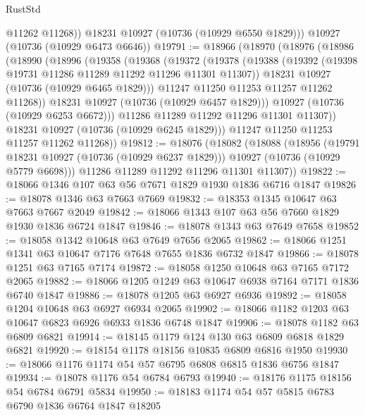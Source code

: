 \begin{lexlean}{RustStd}
\begin{coremodule}
          @11262
          @11268))
      @18231
      @10927
      (@10736 (@10929 @6550 @1829)))
    @10927
    (@10736 (@10929 @6473 @6646))
@19791 := @18966
    (@18970
      (@18976
        (@18986
          (@18990
            (@18996
              (@19358
                (@19368
                  (@19372
                    (@19378
                      (@19388
                        (@19392 (@19398 @19731 @11286 @11289 @11292 @11296 @11301 @11307))
                        @18231
                        @10927
                        (@10736 (@10929 @6465 @1829)))
                      @11247
                      @11250
                      @11253
                      @11257
                      @11262
                      @11268))
                  @18231
                  @10927
                  (@10736 (@10929 @6457 @1829)))
                @10927
                (@10736 (@10929 @6253 @6672)))
              @11286
              @11289
              @11292
              @11296
              @11301
              @11307))
          @18231
          @10927
          (@10736 (@10929 @6245 @1829)))
        @11247
        @11250
        @11253
        @11257
        @11262
        @11268))
@19812 := @18076
    (@18082
      (@18088
        (@18956
          (@19791 @18231 @10927 (@10736 (@10929 @6237 @1829)))
          @10927
          (@10736 (@10929 @5779 @6698)))
        @11286
        @11289
        @11292
        @11296
        @11301
        @11307))
@19822 := @18066 @1346 @107 @63 @56 @7671 @1829 @1930 @1836 @6716 @1847
@19826 := @18078 @1346 @63 @7663 @7669
@19832 := @18353 @1345 @10647 @63 @7663 @7667 @2049
@19842 := @18066 @1343 @107 @63 @56 @7660 @1829 @1930 @1836 @6724 @1847
@19846 := @18078 @1343 @63 @7649 @7658
@19852 := @18058 @1342 @10648 @63 @7649 @7656 @2065
@19862 := @18066 @1251 @1341 @63 @10647 @7176 @7648 @7655 @1836 @6732 @1847
@19866 := @18078 @1251 @63 @7165 @7174
@19872 := @18058 @1250 @10648 @63 @7165 @7172 @2065
@19882 := @18066 @1205 @1249 @63 @10647 @6938 @7164 @7171 @1836 @6740 @1847
@19886 := @18078 @1205 @63 @6927 @6936
@19892 := @18058 @1204 @10648 @63 @6927 @6934 @2065
@19902 := @18066 @1182 @1203 @63 @10647 @6823 @6926 @6933 @1836 @6748 @1847
@19906 := @18078 @1182 @63 @6809 @6821
@19914 := @18145 @1179 @124 @130 @63 @6809 @6818 @1829 @6821
@19920 := @18154 @1178 @18156 @10835 @6809 @6816 @1950
@19930 := @18066 @1176 @1174 @54 @57 @6795 @6808 @6815 @1836 @6756 @1847
@19934 := @18078 @1176 @54 @6784 @6793
@19940 := @18176 @1175 @18156 @54 @6784 @6791 @5834
@19950 := @18183 @1174 @54 @57 @5815 @6783 @6790 @1836 @6764 @1847 @18205

\end{coremodule}
\end{lexlean}
